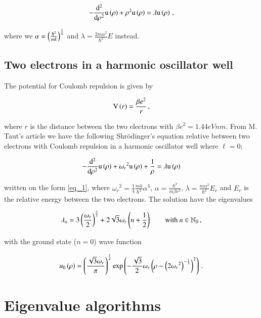 \documentclass[11pt,english,a4paper]{article}
\begin{document}
\begin{flushleft}
\begin{align}
-\frac{\mathrm{d}^2}{\mathrm{d}\rho^2} \mathrm{u}\left({\rho}\right) + \rho^2 \mathrm{u}\left({\rho}\right) = \lambda\mathrm{u}\left({\rho}\right) \,,
\label{eq_4}
\end{align}

where we $\alpha = \left({\frac{\hbar^2}{m k}}\right)^{\frac{1}{4}}$ and $\lambda = \frac{2m\alpha^2}{\hbar^2} E$ instead.

\subsection{Two electrons in a harmonic oscillator well}

The potential for Coulomb repulsion is given by 

\begin{align*}
\mathrm{V}\left({r}\right) = \frac{\beta e^2}{r} \,,
\end{align*}

where $r$ is the distance between the two electrons with $\beta e^2 = 1.44\unit{eVnm}$. From M. Taut's article \cite{TwoElectron} we have the following Shr\"{o}dinger's equation relative between two electrons with Coulomb repulsion in a harmonic oscillator well where $\ell = 0$;

\begin{align}
-\frac{\mathrm{d}^2}{\mathrm{d}\rho^2} \mathrm{u}\left({\rho}\right) + {\omega_r}^2\mathrm{u}\left({\rho}\right) + \frac{1}{\rho} = \lambda \mathrm{u}\left({\rho}\right) 
\label{eq_5}
\end{align}

written on the form \eqref{eq_1}, where ${\omega_r}^2 = \frac{1}{4}\frac{mk}{\hbar^2} \alpha^4$, $\alpha = \frac{\hbar^2}{m\beta e^2}$, $\lambda = \frac{m\alpha^2}{\hbar^2} E_r$ and $E_r$ is the relative energy between the two electrons. The solution have the eigenvalues

\begin{align}
\lambda_n = 3\left({\frac{\omega_r}{2}}\right)^{\frac{2}{3}} + 2\sqrt{3}\omega_r\left({n+\frac{1}{2}}\right) \qquad \text{with } n \in \mathbb{N}_0 \,,
\label{eq_6}
\end{align}

with the ground state ($n=0$) wave function

\begin{align}
u_0\left({\rho}\right) = \left({\frac{\sqrt{3}\omega_r}{\pi}}\right)^{\frac{1}{4}}\exp\left({-\frac{\sqrt{3}}{2}\omega_r\left({\rho-\left({2{\omega_r}^2}\right)^{-\frac{1}{3}}}\right)^2}\right) \,.
\label{eq_7}
\end{align}

\section{Eigenvalue algorithms}


\end{flushleft}
\end{document}
